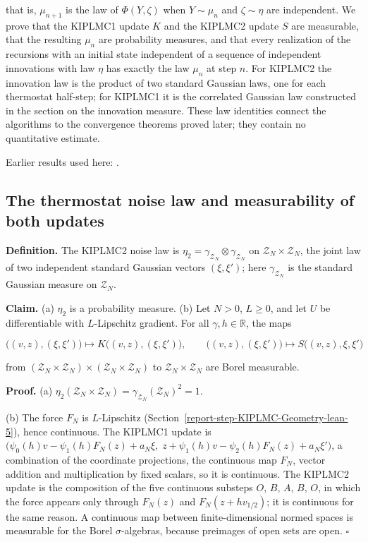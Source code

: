 \documentclass[11pt,a4paper]{report}
\begin{document}
that is, \(\mu_{n+1}\) is the law of \(\Phi(Y,\zeta)\) when \(Y\sim\mu_n\) and \(\zeta\sim\eta\) are independent. We prove that the KIPLMC1 update \(K\) and the KIPLMC2 update \(S\) are measurable, that the resulting \(\mu_n\) are probability measures, and that every realization of the recursions with an initial state independent of a sequence of independent innovations with law \(\eta\) has exactly the law \(\mu_n\) at step \(n\). For KIPLMC2 the innovation law is the product of two standard Gaussian laws, one for each thermostat half-step; for KIPLMC1 it is the correlated Gaussian law constructed in the section on the innovation measure. These law identities connect the algorithms to the convergence theorems proved later; they contain no quantitative estimate.



Earlier results used here: \cite[Section~3.33]{LangevinLean2026ULASC}.
\subsection{\texorpdfstring{The thermostat noise law and measurability of both updates}{The thermostat noise law and measurability of both updates}}
\label{report-step-KIPLMC-Laws-lean-1}


\textbf{Definition.} The KIPLMC2 noise law is \(\eta_2=\gamma_{\mathcal Z_N}\otimes\gamma_{\mathcal Z_N}\) on \(\mathcal Z_N\times\mathcal Z_N\), the joint law of two independent standard Gaussian vectors \((\xi,\xi')\); here \(\gamma_{\mathcal Z_N}\) is the standard Gaussian measure on \(\mathcal Z_N\).




\textbf{Claim.} (a) \(\eta_2\) is a probability measure. (b) Let \(N>0\), \(L\ge0\), and let \(U\) be differentiable with \(L\)-Lipschitz gradient. For all \(\gamma,h\in\mathbb R\), the maps


\[\bigl((v,z),(\xi,\xi')\bigr)\mapsto K\bigl((v,z),(\xi,\xi')\bigr),\qquad\bigl((v,z),(\xi,\xi')\bigr)\mapsto S\bigl((v,z),\xi,\xi'\bigr)\]


from \((\mathcal Z_N\times\mathcal Z_N)\times(\mathcal Z_N\times\mathcal Z_N)\) to \(\mathcal Z_N\times\mathcal Z_N\) are Borel measurable.




\textbf{Proof.} (a) \(\eta_2(\mathcal Z_N\times\mathcal Z_N)=\gamma_{\mathcal Z_N}(\mathcal Z_N)^2=1\).




(b) The force \(F_N\) is \(L\)-Lipschitz (Section~\ref{report-step-KIPLMC-Geometry-lean-5}), hence continuous. The KIPLMC1 update is \(\bigl(\psi_0(h)v-\psi_1(h)F_N(z)+a_N\xi,\;z+\psi_1(h)v-\psi_2(h)F_N(z)+a_N\xi'\bigr)\), a combination of the coordinate projections, the continuous map \(F_N\), vector addition and multiplication by fixed scalars, so it is continuous. The KIPLMC2 update is the composition of the five continuous substeps \(O\), \(B\), \(A\), \(B\), \(O\), in which the force appears only through \(F_N(z)\) and \(F_N(z+hv_{1/2})\); it is continuous for the same reason. A continuous map between finite-dimensional normed spaces is measurable for the Borel \(\sigma\)-algebras, because preimages of open sets are open. \(\square\)
\end{document}
